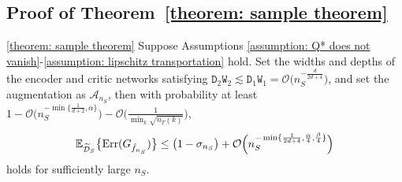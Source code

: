 \subsection{Proof of Theorem~\ref{theorem: sample theorem}}
\begin{mythm}{\ref{theorem: sample theorem}}
    Suppose Assumptions \ref{assumption: Q* does not vanish}-\ref{assumption: lipschitz transportation} hold. Set the widths and depths of the encoder and critic networks satisfying $\mathtt{D}_2\mathtt{W}_2\lesssim\mathtt{D}_1\mathtt{W}_1 = \mathcal{O}\big(n_S^{-\frac{d}{2d+4}}\big)$, and set the augmentation as $\mathcal{A}_{n_S}$, then with probability at least $1 - \mathcal{O}\big(n_S^{-\min\{\frac{1}{d+2}, \alpha\}}\big) - \mathcal{O}\big(\frac{1}{\min_{k}\sqrt{n_T(k)}}\big)$,
    \begin{align*}
        \mathbb{E}_{\widetilde{\mathcal{D}}_S}\big\{\mathrm{Err}(G_{\hat{f}_{n_S}})\big\} \leq \big(1 - \sigma_{n_S}\big) + \mathcal{O}\Big(n_S^{-\min\{\frac{1}{2d+4}, \frac{\alpha}{4}, \frac{\beta}{4}\}}\Big)
    \end{align*}
holds for sufficiently large $n_S$.
\end{mythm}
